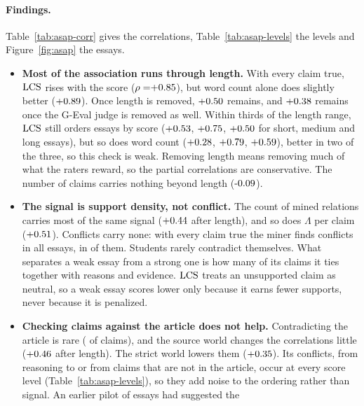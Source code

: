 \paragraph{Findings.} Table~\ref{tab:asap-corr} gives the correlations, Table~\ref{tab:asap-levels}
the levels and Figure~\ref{fig:asap} the essays.
\begin{itemize}[leftmargin=1.2em,itemsep=1pt,topsep=2pt]
\item \textbf{Most of the association runs through length.} With every claim true, $\mathrm{LCS}$ rises
  with the score ($\rho=\asapRhoLcsAsserted$), but word count alone does slightly better
  ($\asapRhoWords$). Once length is removed, $\asapParLcsAsserted$ remains, and $\asapPwjLcsAsserted$ remains once the
  G-Eval judge is removed as well. Within thirds of the length range, $\mathrm{LCS}$ still orders essays
  by score ($\asapTertShortRhoLcsAsserted$, $\asapTertMediumRhoLcsAsserted$,
  $\asapTertLongRhoLcsAsserted$ for short, medium and long essays), but so does word count
  ($\asapTertShortRhoWords$, $\asapTertMediumRhoWords$, $\asapTertLongRhoWords$), better in two of the
  three, so this check is weak. Removing length means
  removing much of what the raters reward, so the partial correlations are conservative. The
  number of claims carries nothing beyond length ($\asapParClaims$).
\item \textbf{The signal is support density, not conflict.} The count of mined relations carries
  most of the same signal ($\asapParRelations$ after length), and so does $\Lambda$ per claim
  ($\asapParLpcAsserted$). Conflicts carry none: with every claim true the miner finds
  \asapConfAsserted{} conflicts in all \asapEssays{} essays, in \asapConfEssaysAsserted{} of
  them. Students rarely contradict themselves. What separates a weak essay from a strong one is
  how many of its claims it ties together with reasons and evidence. $\mathrm{LCS}$ treats an unsupported
  claim as neutral, so a weak essay scores lower only because it earns fewer supports, never
  because it is penalized.
\item \textbf{Checking claims against the article does not help.} Contradicting the article is
  rare (\asapLabContradicted{} of \asapClaims{} claims), and the source world changes the
  correlations little ($\asapParLcsSource$ after length). The strict world lowers them
  ($\asapParLcsStrict$). Its conflicts, from reasoning to or from claims that are not in the
  article, occur at every score level (Table~\ref{tab:asap-levels}), so they add noise to the
  ordering rather than signal. An earlier pilot of \asapPilotN{} essays had suggested the

\end{itemize}
